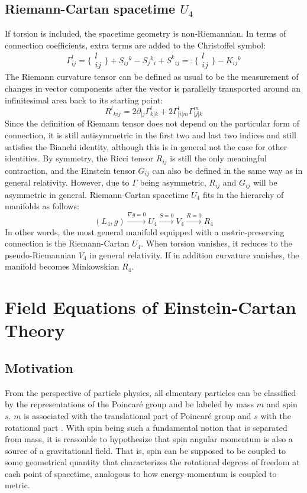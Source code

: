 \documentclass[12pt]{article}
\begin{document}
\subsection{Riemann-Cartan spacetime $U_4$}
If torsion is included, the spacetime geometry is non-Riemannian. In terms of connection coefficients, extra terms are added to the Christoffel symbol:
\[ \Gamma^l_{ij} = \{\substack{l\\ij}\} + S_{ij}{}^k - S_j{}^k{}_i + S^k{}_{ij} =: \{\substack{l\\ij}\} - K_{ij}{}^k \]
The Riemann curvature tensor can be defined as usual to be the measurement of changes in vector components after the vector is parallelly transported around an infinitesimal area back to its starting point:
\[ R^l{}_{kij} = 2\partial_{[j}\Gamma^l_{k]k} + 2\Gamma^l_{[i|m}\Gamma^m_{|j]k} \] 
Since the definition of Riemann tensor does not depend on the particular form of connection, it is still antisymmetric in the first two and last two indices and still satisfies the Bianchi identity, although this is in general not the case for other identities. By symmetry, the Ricci tensor $R_{ij}$ is still the only meaningful contraction, and the Einstein tensor $G_{ij}$ can also be defined in the same way as in general relativity. However, due to $\Gamma$ being asymmetric, $R_{ij}$ and $G_{ij}$ will be asymmetric in general. Riemann-Cartan spacetime $U_4$ fits in the hierarchy of manifolds as follows:
\[ (L_4, g) \xrightarrow{\nabla g = 0} U_4 \xrightarrow{S=0} V_4 \xrightarrow{R = 0} R_4\]
In other words, the most general manifold equipped with a metric-preserving connection is the Riemann-Cartan $U_4$. When torsion vanishes, it reduces to the pseudo-Riemannian $V_4$ in general relativity. If in addition curvature vanishes, the manifold becomes Minkowskian $R_4$.

\section{Field Equations of Einstein-Cartan Theory}
\subsection{Motivation}
From the perspective of particle physics, all elmentary particles can be classified by the representations of the Poincar\'e group and be labeled by mass $m$ and spin $s$. $m$ is associated with the translational part of Poincar\'e group and $s$ with the rotational part \cite{hehl1976general}. With spin being such a fundamental notion that is separated from mass, it is reasonble to hypothesize that spin angular momentum is also a source of a gravitational field. That is, spin can be supposed to be coupled to some geometrical quantity that characterizes the rotational degrees of freedom at each point of spacetime, analogous to how energy-momentum is coupled to metric.
\end{document}
